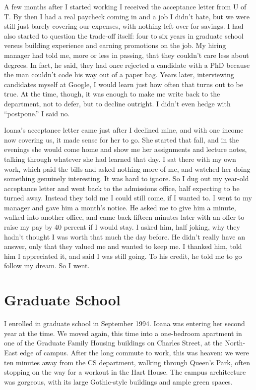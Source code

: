 \documentclass[12pt]{book}
\begin{document}
A few months after I started working I received the acceptance letter
from U of T. By then I had a real paycheck coming in and a job I didn't
hate, but we were still just barely covering our expenses, with nothing
left over for savings. I had also started to question the trade-off
itself: four to six years in graduate school versus building experience
and earning promotions on the job. My hiring manager had told me, more
or less in passing, that they couldn't care less about degrees. In fact,
he said, they had once rejected a candidate with a PhD because the man
couldn't code his way out of a paper bag. Years later, interviewing
candidates myself at Google, I would learn just how often that turns out
to be true. At the time, though, it was enough to make me write back to
the department, not to defer, but to decline outright. I didn't even
hedge with ``postpone.'' I said no.

Ioana's acceptance letter came just after I declined mine, and with one
income now covering us, it made sense for her to go. She started that
fall, and in the evenings she would come home and show me her
assignments and lecture notes, talking through whatever she had learned
that day. I sat there with my own work, which paid the bills and asked
nothing more of me, and watched her doing something genuinely
interesting. It was hard to ignore. So I dug out my year-old acceptance
letter and went back to the admissions office, half expecting to be
turned away. Instead they told me I could still come, if I wanted to. I
went to my manager and gave him a month's notice. He asked me to give
him a minute, walked into another office, and came back fifteen minutes
later with an offer to raise my pay by 40 percent if I would stay. I
asked him, half joking, why they hadn't thought I was worth that much
the day before. He didn't really have an answer, only that they valued
me and wanted to keep me. I thanked him, told him I appreciated it, and
said I was still going. To his credit, he told me to go follow my dream.
So I went.


\section{Graduate School}

I enrolled in graduate school in September 1994. Ioana was entering her
second year at the time. We moved again, this time into a one-bedroom
apartment in one of the Graduate Family Housing buildings on Charles
Street, at the North-East edge of campus. After the long commute to
work, this was heaven: we were ten minutes away from the CS department,
walking through Queen's Park, often stopping on the way for a workout in
the Hart House. The campus architecture was gorgeous, with its large
Gothic-style buildings and ample green spaces.
\end{document}
